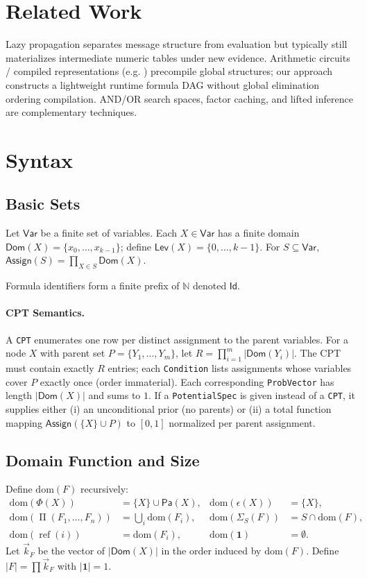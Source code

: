\documentclass[11pt]{article}
\newcommand{\Var}{\mathsf{Var}}
\newcommand{\Dom}{\mathsf{Dom}}
\newcommand{\Levels}{\mathsf{Lev}}
\newcommand{\Assign}{\mathsf{Assign}}
\newcommand{\Pa}{\mathsf{Pa}}
\newcommand{\Id}{\mathsf{Id}}
\newcommand{\fref}[1]{\operatorname{ref}(#1)}
\newcommand{\Prod}{\operatorname{\Pi}}
\newcommand{\Unit}{\mathbf{1}}
\newcommand{\Potf}{\Phi}
\newcommand{\Evid}{\epsilon}
\begin{document}
\section{Related Work}
Lazy propagation \cite{madsen1999lazy} separates message structure from evaluation but typically still materializes intermediate numeric tables under new evidence. Arithmetic circuits / compiled representations (e.g. \cite{darwiche2003differential}) precompile global structures; our approach constructs a lightweight runtime formula DAG without global elimination ordering compilation. AND/OR search spaces, factor caching, and lifted inference are complementary techniques.

\section{Syntax}
\subsection{Basic Sets}
Let $\Var$ be a finite set of variables. Each $X\in\Var$ has a finite domain $\Dom(X)=\{x_0,\dots,x_{k-1}\}$; define $\Levels(X)=\{0,\dots,k-1\}$. For $S\subseteq \Var$, $\Assign(S)=\prod_{X\in S} \Dom(X)$.

Formula identifiers form a finite prefix of $\mathbb{N}$ denoted $\Id$.


\paragraph{CPT Semantics.} A \texttt{CPT} enumerates one row per distinct assignment to the parent variables. For a node $X$ with parent set $P=\{Y_1,\dots,Y_m\}$, let $R = \prod_{i=1}^m |\Dom(Y_i)|$. The CPT must contain exactly $R$ entries; each \texttt{Condition} lists assignments whose variables cover $P$ exactly once (order immaterial). Each corresponding \texttt{ProbVector} has length $|\Dom(X)|$ and sums to $1$. If a \texttt{PotentialSpec} is given instead of a \texttt{CPT}, it supplies either (i) an unconditional prior (no parents) or (ii) a total function mapping $\Assign(\{X\}\cup P)$ to $[0,1]$ normalized per parent assignment.

\subsection{Domain Function and Size}
Define $\mathrm{dom}(F)$ recursively:
\begin{align*}
\mathrm{dom}(\Potf(X)) &= \{X\}\cup \Pa(X), & \mathrm{dom}(\Evid(X)) &= \{X\},\\
\mathrm{dom}(\Prod(F_1,\dots,F_n)) &= \bigcup_i \mathrm{dom}(F_i), & \mathrm{dom}(\Sigma_S(F)) &= S\cap \mathrm{dom}(F),\\
\mathrm{dom}(\fref{i}) &= \mathrm{dom}(F_i), & \mathrm{dom}(\Unit) &= \emptyset.
\end{align*}
Let $\vec{k}_F$ be the vector of $|\Dom(X)|$ in the order induced by $\mathrm{dom}(F)$. Define $|F| = \prod \vec{k}_F$ with $|\Unit|=1$.
\end{document}
